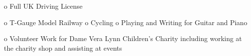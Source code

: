 \documentclass[9pt]{developercv} %
\begin{document}
\begin{entrylist}

\entry
		{}
		{}
		{}
		{o Full UK Driving License}
		
	\end{entrylist}

\begin{minipage}[t]{0.5\textwidth}
	\vspace{-\baselineskip} %

\end{minipage}
\hfill
\begin{minipage}[t]{0.5\textwidth}
	\vspace{-\baselineskip} %
	
	\newline o T-Gauge Model Railway
	\newline o Cycling
	\newline o Playing and Writing for Guitar and Piano
\end{minipage}
\hfill
\begin{minipage}[t]{0.3\textwidth}
	\vspace{-\baselineskip} %
	
	\newline o Volunteer Work for Dame Vera Lynn Children's Charity including working at the charity shop and assisting at events
\end{minipage}

\end{document}
